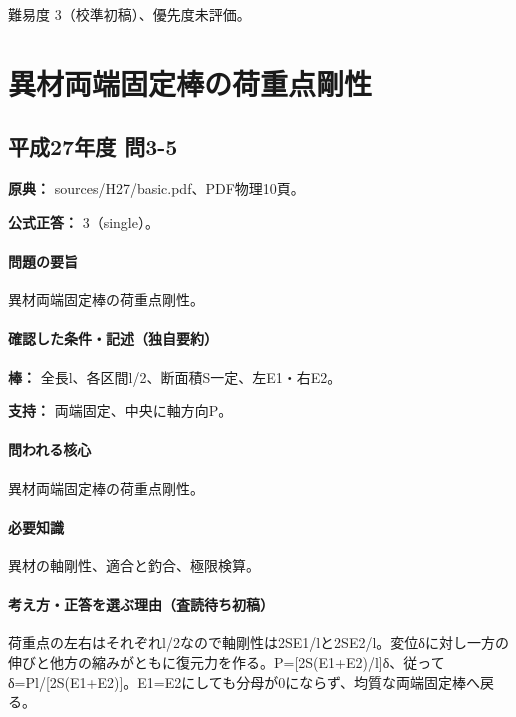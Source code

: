 \par 難易度 3（校準初稿）、優先度未評価。

\section{異材両端固定棒の荷重点剛性}

\subsection{平成27年度 問3-5}
\label{q:h27-reg-basic-3-5}

\noindent\textbf{原典：} sources/H27/basic.pdf、PDF物理10頁。

\textbf{公式正答：} 3（single）。

\paragraph{問題の要旨} 異材両端固定棒の荷重点剛性。

\paragraph{確認した条件・記述（独自要約）}\mbox{}\par

\noindent\textbf{棒：} 全長l、各区間l/2、断面積S一定、左E1・右E2。\par

\noindent\textbf{支持：} 両端固定、中央に軸方向P。\par

\paragraph{問われる核心} 異材両端固定棒の荷重点剛性。

\paragraph{必要知識} 異材の軸剛性、適合と釣合、極限検算。

\paragraph{考え方・正答を選ぶ理由（査読待ち初稿）} 荷重点の左右はそれぞれl/2なので軸剛性は2SE1/lと2SE2/l。変位δに対し一方の伸びと他方の縮みがともに復元力を作る。P=[2S(E1+E2)/l]δ、従ってδ=Pl/[2S(E1+E2)]。E1=\allowbreak{}E2にしても分母が0にならず、均質な両端固定棒へ戻る。

